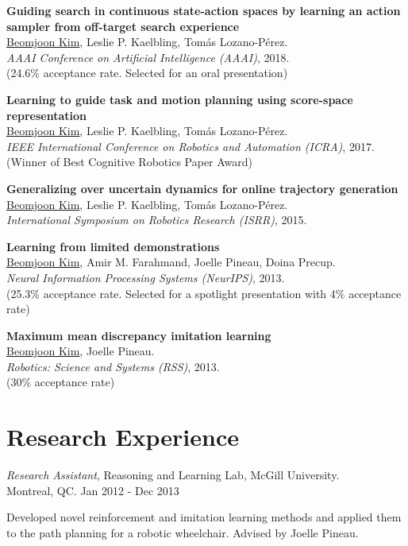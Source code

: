 \documentclass[line,margin,letterpaper]{res}
\begin{document}
\begin{resume}
\textbf{Guiding search in continuous state-action spaces by learning an action sampler from off-target search experience}\\
\underline{Beomjoon Kim}, Leslie P. Kaelbling, Tom\'as Lozano-P\'erez.\\
{\sl AAAI Conference on Artificial Intelligence (AAAI)}, 2018.\\
{\small (24.6\% acceptance rate. Selected for an oral presentation)}

\textbf{Learning to guide task and motion planning using score-space representation}\\
\underline{Beomjoon Kim}, Leslie P. Kaelbling, Tom\'as Lozano-P\'erez.\\
{\sl IEEE International Conference on Robotics and Automation (ICRA)}, 2017.\\
{\small({\color{red}Winner of Best Cognitive Robotics Paper Award})}


\textbf{Generalizing over uncertain dynamics for online trajectory generation}\\
\underline{Beomjoon Kim}, Leslie P. Kaelbling, Tom\'as Lozano-P\'erez.\\
{\sl International Symposium on Robotics Research (ISRR)}, 2015.

\textbf{Learning from limited demonstrations}\\
\underline{Beomjoon Kim}, Amir M. Farahmand, Joelle Pineau, Doina Precup.\\
{\sl Neural Information Processing Systems (NeurIPS)}, 2013.\\
{\small (25.3\% acceptance rate. Selected for a spotlight presentation with 4\% acceptance rate)}

\textbf{Maximum mean discrepancy imitation learning}\\
\underline{Beomjoon Kim}, Joelle Pineau.\\
{\sl  Robotics: Science and Systems (RSS)}, 2013.\\
{\small (30\% acceptance rate)}

\section{Research Experience}


{\sl Research Assistant}, Reasoning and Learning Lab, McGill University.
\\ \hfill Montreal, QC. Jan 2012 - Dec 2013
\begin{list}{}
\item Developed novel reinforcement and imitation learning methods and applied them to the path planning for a robotic wheelchair. Advised by Joelle Pineau.
\end{list}


\end{resume}
\end{document}
